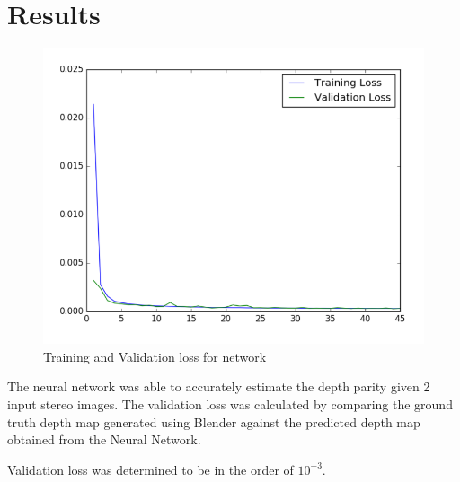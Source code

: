\section{Results}

\begin{figure}
  \includegraphics[width=\linewidth]{images/validationloss.png}
  \caption{Training and Validation loss for network}
  \label{fig:boat1}
\end{figure}

The neural network was able to accurately estimate the depth parity given 2 input stereo images. The validation loss was calculated by comparing the ground truth depth map generated using Blender against the predicted depth map obtained from the Neural Network.

Validation loss was determined to be in the order of  $10^{-3}$. 

